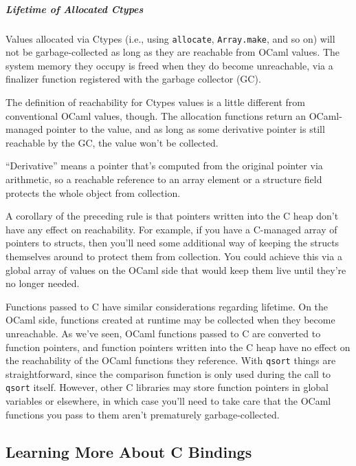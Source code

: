 \hypertarget{lifetime-of-allocated-ctypes}{%
\subparagraph{Lifetime of Allocated
Ctypes}\label{lifetime-of-allocated-ctypes}}

Values allocated via Ctypes (i.e., using
\passthrough{\lstinline!allocate!},
\passthrough{\lstinline!Array.make!}, and so on) will not be
garbage-collected as long as they are reachable from OCaml values. The
system memory they occupy is freed when they do become unreachable, via
a finalizer function registered with the garbage collector (GC).

The definition of reachability for Ctypes values is a little different
from conventional OCaml values, though. The allocation functions return
an OCaml-managed pointer to the value, and as long as some derivative
pointer is still reachable by the GC, the value won't be collected.

``Derivative'' means a pointer that's computed from the original pointer
via arithmetic, so a reachable reference to an array element or a
structure field protects the whole object from collection.

A corollary of the preceding rule is that pointers written into the C
heap don't have any effect on reachability. For example, if you have a
C-managed array of pointers to structs, then you'll need some additional
way of keeping the structs themselves around to protect them from
collection. You could achieve this via a global array of values on the
OCaml side that would keep them live until they're no longer needed.

Functions passed to C have similar considerations regarding lifetime. On
the OCaml side, functions created at runtime may be collected when they
become unreachable. As we've seen, OCaml functions passed to C are
converted to function pointers, and function pointers written into the C
heap have no effect on the reachability of the OCaml functions they
reference. With \passthrough{\lstinline!qsort!} things are
straightforward, since the comparison function is only used during the
call to \passthrough{\lstinline!qsort!} itself. However, other C
libraries may store function pointers in global variables or elsewhere,
in which case you'll need to take care that the OCaml functions you pass
to them aren't prematurely garbage-collected.

\hypertarget{learning-more-about-c-bindings}{%
\subsection{Learning More About C
Bindings}\label{learning-more-about-c-bindings}}

